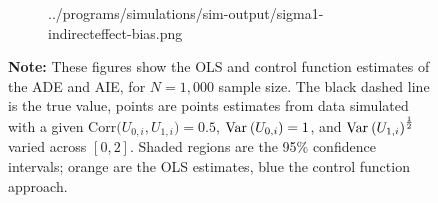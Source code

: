 \begin{figure}[h!]
\begin{subfigure}[c]{0.475\textwidth}
{            ../programs/simulations/sim-output/sigma1-indirecteffect-bias.png}
    \end{subfigure}
    \label{fig:sigma-1-bias}
    \justify
    \footnotesize    
    \textbf{Note:}
    These figures show the OLS and control function estimates of the ADE and AIE, for $N = 1,000$ sample size.
    The black dashed line is the true value, points are points estimates from data simulated with a given $\text{Corr}\big(U_{0,i}, U_{1,i}\big) =0.5$, $\text{Var}_{} \left( U_{0,i} \right) = 1$, and $\text{Var}_{} \left( U_{1,i} \right)^{\frac12}$ varied across $[0, 2]$.
    Shaded regions are the 95\% confidence intervals;
    orange are the OLS estimates, blue the control function approach.
\end{figure}

